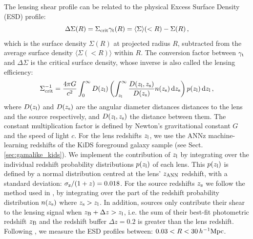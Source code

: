 \documentclass[usenatbib]{mnras}
\newcommand{\hMpc}{\, h^{-1}{\rm{Mpc}} }
\newcommand*{\meanb}[1]{\langle{#1}\rangle}
\newcommand{\un}[1]{_{\rm #1}}
\begin{document}
The lensing shear profile can be related to the physical Excess Surface Density (ESD) profile:
\begin{equation}
	\Delta \Sigma (R) = \Sigma_{\rm crit} \gamma_{\rm t}(R) = \meanb{\Sigma}(<R) - \Sigma(R) \, ,
	\label{eq:deltasigma}
\end{equation}
which is the surface density $\Sigma(R)$ at projected radius $R$, subtracted from the average surface density $\meanb{\Sigma(<R)}$ within $R$. The conversion factor between $\gamma\un{t}$ and $\Delta\Sigma$ is the critical surface density, whose inverse is also called the lensing efficiency:
\begin{equation}
	\Sigma\un{crit}^{-1} = \frac{4\pi G}{c^2} \int_{0}^{\infty} D(z\un{l}) \left( \int_{z\un{l}}^{\infty}  \frac{D(z\un{l}, z\un{s})}{D(z\un{s})} n(z\un{s}) \, {\rm d} z\un{s} \right) p(z\un{l}) \, {\rm d} z\un{l} \, ,
	\label{eq:sigmacrit}
\end{equation}
where $D(z\un{l})$ and $D(z\un{s})$ are the angular diameter distances distances to the lens and the source respectively, and $D(z\un{l}, z\un{s})$ the distance between them. The constant multiplication factor is defined by Newton's gravitational constant $G$ and the speed of light $c$. For the lens redshifts $z\un{l}$, we use the ANNz machine-learning redshifts of the KiDS foreground galaxy sample (see Sect. \ref{sec:gamalike_kids}). We implement the contribution of $z\un{l}$ by integrating over the individual redshift probability distributions $p(z\un{l})$ of each lens. This $p(z\un{l})$ is defined by a normal distribution centred at the lens' $z\un{ANN}$ redshift, with a standard deviation: $\sigma\un{z}/(1+z) = 0.018$. For the source redshifts $z\un{s}$ we follow the method used in \cite{dvornik2018}, by integrating over the part of the redshift probability distribution $n(z\un{s})$ where $z\un{s}>z\un{l}$. In addition, sources only contribute their shear to the lensing signal when $z\un{B}+\Delta z > z\un{l}$, i.e. the sum of their best-fit photometric redshift $z\un{B}$ and the redshift buffer $\Delta z=0.2$ is greater than the lens redshift. Following \cite{brouwer2017}, we measure the ESD profiles between: $0.03 < R < 30 \hMpc$.
\end{document}
